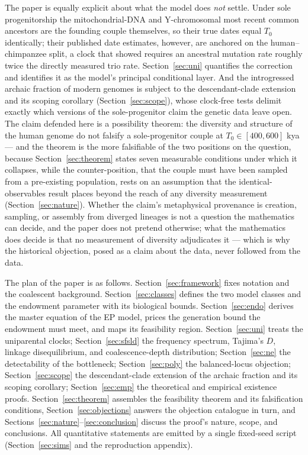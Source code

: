 The paper is equally explicit about what the model does \emph{not} settle.
Under sole progenitorship the mitochondrial-DNA and Y-chromosomal most
recent common ancestors are the founding couple themselves, so their true
dates equal $T_0$ identically; their published date estimates, however, are
anchored on the human--chimpanzee split, a clock that \citet{Scally2012}
showed requires an ancestral mutation rate roughly twice the directly
measured trio rate. Section~\ref{sec:uni} quantifies the correction and
identifies it as the model's principal conditional layer. And the
introgressed archaic fraction of modern genomes is subject to the
descendant-clade extension and its scoping corollary
(Section~\ref{sec:scope}), whose clock-free tests delimit exactly which
versions of the sole-progenitor claim the genetic data leave open. The
claim defended here is a possibility theorem: the diversity and structure of
the human genome do not falsify a sole-progenitor couple at
$T_0 \in [400, 600]$ kya --- and the theorem is the more falsifiable of
the two positions on the question, because Section~\ref{sec:theorem}
states seven measurable conditions under which it collapses, while the
counter-position, that the couple must have been sampled from a
pre-existing population, rests on an assumption that the
identical-observables result places beyond the reach of any diversity
measurement (Section~\ref{sec:nature}). Whether the claim's metaphysical
provenance is creation, sampling, or assembly from diverged lineages is
not a question the mathematics can decide, and the paper does not pretend
otherwise; what the mathematics does decide is that no measurement of
diversity adjudicates it --- which is why the historical objection, posed
as a claim about the data, never followed from the data.

The plan of the paper is as follows. Section~\ref{sec:framework} fixes
notation and the coalescent background. Section~\ref{sec:classes} defines
the two model classes and the endowment parameter with its biological
bounds. Section~\ref{sec:endo} derives the master equation of the EP model,
prices the generation bound the endowment must meet, and maps its
feasibility region. Section~\ref{sec:uni} treats the
uniparental clocks; Section~\ref{sec:sfsld} the frequency spectrum,
Tajima's $D$, linkage disequilibrium, and coalescence-depth distribution;
Section~\ref{sec:ne} the detectability of the bottleneck;
Section~\ref{sec:poly} the balanced-locus objection;
Section~\ref{sec:scope} the descendant-clade extension of the archaic
fraction and its scoping corollary; Section~\ref{sec:emp} the
theoretical and empirical existence proofs. Section~\ref{sec:theorem}
assembles the feasibility theorem and its falsification conditions,
Section~\ref{sec:objections} answers the objection catalogue in turn, and
Sections~\ref{sec:nature}--\ref{sec:conclusion} discuss the proof's nature,
scope, and conclusions. All quantitative statements are emitted by a single
fixed-seed script (Section~\ref{sec:sims} and the reproduction appendix).

